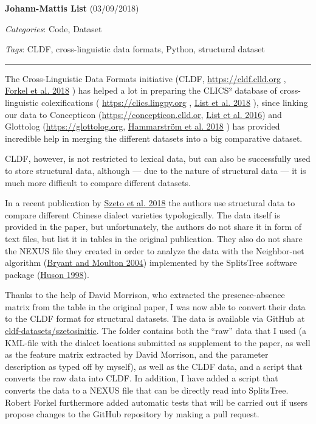 \documentclass[
  english,
  a4paper,
  oneside,tablecaptionabove
]{scrbook}
\begin{document}
\textbf{Johann-Mattis List} (03/09/2018)

\emph{Categories}: Code, Dataset

\emph{Tags}: CLDF, cross-linguistic data formats, Python, structural
dataset

\begin{center}\rule{0.5\linewidth}{\linethickness}\end{center}

The Cross-Linguistic Data Formats initiative (CLDF,
\url{https://cldf.clld.org} ,
\href{http://bibliography.lingpy.org?key=Forkel2018}{Forkel et al. 2018}
) has helped a lot in preparing the CLICS² database of cross-linguistic
colexifications ( \url{https://clics.lingpy.org} ,
\href{http://bibliography.lingpy.org?key=List2018e}{List et al. 2018} ),
since linking our data to Concepticon (\url{https://concepticon.clld.or}, \href{http://bibliography.lingpy.org?key=List2016xxx}{List et al. 2016}) and Glottolog (\url{https://glottolog.org}, \href{http://bibliography.lingpy.org?key=Hammarstroem2018}{Hammarström
et al. 2018} ) has provided incredible help in merging the different
datasets into a big comparative dataset.

CLDF, however, is not restricted to lexical data, but can also be
successfully used to store structural data, although --- due to the
nature of structural data --- it is much more difficult to compare
different datasets.

\leavevmode\hypertarget{markdown}{}%
In a recent publication by
\href{http://bibliography.lingpy.org?key=Szeto2018}{Szeto et al. 2018}
the authors use structural data to compare different Chinese dialect
varieties typologically. The data itself is provided in the paper, but
unfortunately, the authors do not share it in form of text files, but
list it in tables in the original publication. They also do not share
the NEXUS file they created in order to analyze the data with the
Neighbor-net algorithm (\href{http://bibliography.lingpy.org?key=Bryant2004}{Bryant and Moulton
2004}) implemented by the SplitsTree software package (\href{http://bibliography.lingpy.org?key=Huson1998}{Huson 1998}).

Thanks to the help of David Morrison, who extracted the presence-absence
matrix from the table in the original paper, I was now able to convert
their data to the CLDF format for structural datasets. The data is
available via GitHub at
\href{https://github.com/cldf-datasets/szetosinitic}{cldf-datasets/szetosinitic}.
The folder contains both the \enquote{raw} data that I used (a KML-file
with the dialect locations submitted as supplement to the paper, as well
as the feature matrix extracted by David Morrison, and the parameter
description as typed off by myself), as well as the CLDF data, and a
script that converts the raw data into CLDF. In addition, I have added a
script that converts the data to a NEXUS file that can be directly read
into SplitsTree. Robert Forkel furthermore added automatic tests that
will be carried out if users propose changes to the GitHub repository by
making a pull request.
\end{document}
